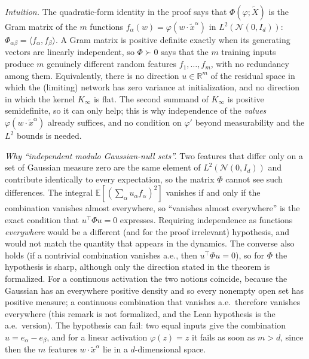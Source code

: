 \begin{remark}\label{rmk:ntktl:posDefIntuition}
\emph{Intuition.} The quadratic-form identity in the proof says that $\Phi(\varphi;\tilde X)$ is the Gram matrix of the $m$ functions
$f_\alpha(w)=\varphi(w\cdot\tilde x^\alpha)$ in $L^2(\mathcal N(0,I_d))$: $\Phi_{\alpha\beta}=\langle f_\alpha,f_\beta\rangle$. A Gram matrix is positive definite exactly when
its generating vectors are linearly independent, so $\Phi\succ0$ says that the $m$ training inputs produce $m$ genuinely different random features
$f_1,\dots,f_m$, with no redundancy among them. Equivalently, there is no direction $u\in\mathbb R^m$ of the residual space in which the (limiting) network has
zero variance at initialization, and no direction in which the kernel $K_\infty$ is flat. The second summand of $K_\infty$ is positive semidefinite, so
it can only help; this is why independence of the \emph{values} $\varphi(w\cdot\tilde x^\alpha)$ already suffices, and no condition on $\varphi'$ beyond measurability and the
$L^2$ bounds is needed.

\emph{Why ``independent modulo Gaussian-null sets''.} Two features that differ only on a set of Gaussian measure zero are the same element of $L^2(\mathcal N(0,I_d))$ and
contribute identically to every expectation, so the matrix $\Phi$ cannot see such differences. The integral $\mathbb E[(\sum_\alpha u_\alpha f_\alpha)^2]$ vanishes if and only if the
combination vanishes almost everywhere, so ``vanishes almost everywhere'' is the exact condition that $u^\top\Phi u=0$ expresses. Requiring independence as functions
\emph{everywhere} would be a different (and for the proof irrelevant) hypothesis, and would not match the quantity that appears in the dynamics. The converse also holds
(if a nontrivial combination vanishes a.e., then $u^\top\Phi u=0$), so for $\Phi$ the hypothesis is sharp, although only the direction stated in the theorem is formalized.
For a continuous activation the two notions coincide, because the Gaussian has an everywhere positive density and so every nonempty open set has positive measure; a continuous
combination that vanishes a.e.\ therefore vanishes everywhere (this remark is not formalized, and the Lean hypothesis is the a.e.\ version). The hypothesis can fail:
two equal inputs give the combination $u=e_\alpha-e_\beta$, and for a linear activation $\varphi(z)=z$ it fails as soon as $m>d$, since then the $m$ features $w\cdot\tilde x^\alpha$ lie in a $d$-dimensional space.


\end{remark}
